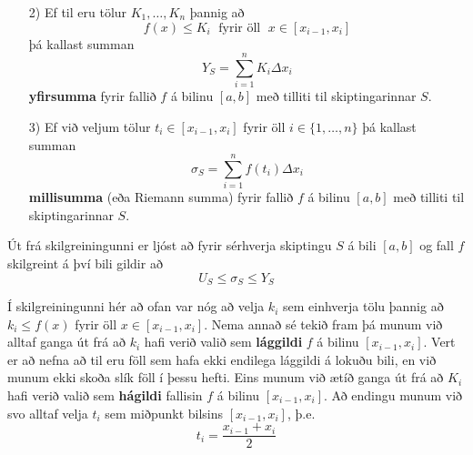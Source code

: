 \newpage

\begin{bluebox}{}
\begin{itemize}

\item[2)] Ef til eru tölur $K_{1},\ldots,K_{n}$ þannig að
$$
f(x) \leq K_{i} \; \text{ fyrir öll } \; x \in [x_{i-1},x_{i}]
$$
þá kallast summan
$$
Y_{S} = \sum_{i = 1}^{n} K_{i}\Delta x_{i}
$$
\textbf{yfirsumma} fyrir fallið $f$ á bilinu $[a,b]$ með tilliti til skiptingarinnar $S$.

\item[3)] Ef við veljum tölur $t_{i} \in [x_{i-1},x_{i}]$ fyrir öll $i \in \{1,\ldots,n\}$ þá kallast summan
$$
\sigma_{S} = \sum_{i = 1}^{n} f\left(t_{i}\right)\Delta x_{i}
$$
\textbf{millisumma} (eða Riemann summa) fyrir fallið $f$ á bilinu $[a,b]$ með tilliti til skiptingarinnar $S$.

\end{itemize}
\end{bluebox}

\begin{ath}
Út frá skilgreiningunni er ljóst að fyrir sérhverja skiptingu $S$ á bili $[a,b]$ og fall $f$ skilgreint á því bili gildir að
$$
U_{S} \leq \sigma_{S} \leq Y_{S}
$$
\end{ath}

\begin{ath}
Í skilgreiningunni hér að ofan var nóg að velja $k_i$ sem einhverja tölu þannig að $k_i \leq f(x)$ fyrir öll $x \in [x_{i-1},x_{i}]$. Nema annað sé tekið fram þá munum við alltaf ganga út frá að $k_i$ hafi verið valið sem \textbf{lággildi} $f$ á bilinu $[x_{i-1},x_{i}]$. Vert er að nefna að til eru föll sem hafa ekki endilega lággildi á lokuðu bili, en við munum ekki skoða slík föll í þessu hefti. Eins munum við ætíð ganga út frá að $K_i$ hafi verið valið sem \textbf{hágildi} fallisin $f$ á bilinu $[x_{i-1},x_{i}]$. Að endingu munum við svo alltaf velja $t_{i}$ sem miðpunkt bilsins $[x_{i-1},x_{i}]$, þ.e.
$$
t_{i} = \frac{x_{i-1}+x_{i}}{2}
$$
\end{ath}

